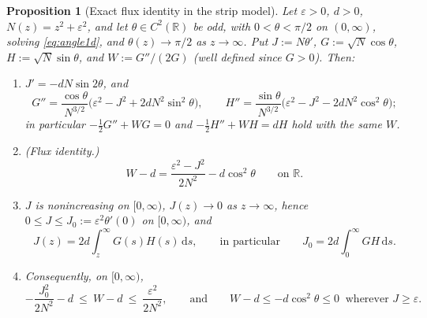 \documentclass[11pt,a4paper]{article}
\theoremstyle{plain}
\newtheorem{proposition}[theorem]{Proposition}
\theoremstyle{definition}
\theoremstyle{remark}
\newcommand{\R}{\mathbb{R}}
\newcommand{\dd}{\,\mathrm{d}}
\begin{document}
\begin{proposition}[Exact flux identity in the strip model]\label{prop:flux}
Let $\varepsilon>0$, $d>0$, $N(z)=z^2+\varepsilon^2$, and let $\theta\in C^2(\R)$ be odd, with $0<\theta<\pi/2$ on $(0,\infty)$, solving \eqref{eq:angle1d}, and $\theta(z)\to\pi/2$ as $z\to\infty$. Put $J:=N\theta'$, $G:=\sqrt N\cos\theta$, $H:=\sqrt N\sin\theta$, and $W:=G''/(2G)$ (well defined since $G>0$). Then:
\begin{enumerate}
\item[(a)] $J'=-dN\sin2\theta$, and
\begin{equation}\label{eq:Gpp}
G''=\frac{\cos\theta}{N^{3/2}}\Big(\varepsilon^2-J^2+2dN^2\sin^2\theta\Big),\qquad
H''=\frac{\sin\theta}{N^{3/2}}\Big(\varepsilon^2-J^2-2dN^2\cos^2\theta\Big);
\end{equation}
in particular $-\tfrac12G''+WG=0$ and $-\tfrac12H''+WH=dH$ hold with the same $W$.
\item[(b)] (Flux identity.)
\begin{equation}\label{eq:fluxid}
W-d=\frac{\varepsilon^2-J^2}{2N^2}-d\cos^2\theta\qquad\text{on }\R .
\end{equation}
\item[(c)] $J$ is nonincreasing on $[0,\infty)$, $J(z)\to0$ as $z\to\infty$, hence $0\le J\le J_0:=\varepsilon^2\theta'(0)$ on $[0,\infty)$, and
\begin{equation}\label{eq:Jint}
J(z)=2d\int_z^\infty G(s)H(s)\dd s,\qquad\text{in particular}\qquad J_0=2d\int_0^\infty GH\dd s .
\end{equation}
\item[(d)] Consequently, on $[0,\infty)$,
\[
-\frac{J_0^2}{2N^2}-d\ \le\ W-d\ \le\ \frac{\varepsilon^2}{2N^2},\qquad\text{and}\qquad W-d\le-d\cos^2\theta\le0\ \text{ wherever }J\ge\varepsilon .
\]
\end{enumerate}
\end{proposition}
\end{document}
